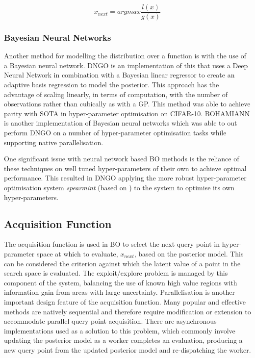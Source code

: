 			\begin{equation}\label{eq:TPE2} x_{next} = argmax \frac{l(x)}{g(x)}\end{equation}


		\subsubsection{Bayesian Neural Networks}

			Another method for modelling the distribution over a function is with the use of a Bayesian neural network. DNGO \cite{22} is an implementation of this that uses a Deep Neural Network in combination with a Bayesian linear regressor to create an adaptive basis regression to model the posterior. This approach has the advantage of scaling linearly, in terms of computation, with the number of observations rather than cubically as with a GP. This method was able to achieve parity with SOTA in hyper-parameter optimisation on CIFAR-10. BOHAMIANN \cite{40} is another implementation of Bayesian neural networks which was able to out perform DNGO on a number of hyper-parameter optimisation tasks while supporting native parallelisation. 
			\par
			One significant issue with neural network based BO methods is the reliance of these techniques on well tuned hyper-parameters of their own to achieve optimal performance. This resulted in DNGO applying the more robust hyper-parameter optimisation system \textit{spearmint} (based on \cite{20}) to the system to optimise its own hyper-parameters.




	\subsection {Acquisition Function} \label{AF}

		The acquisition function is used in BO to select the next query point in hyper-parameter space at which to evaluate, \(x_{next}\), based on the posterior model. This can be considered the criterion against which the latent value of a point in the search space is evaluated. The exploit/explore problem is managed by this component of the system, balancing the use of known high value regions with information gain from areas with large uncertainty. Parallelisation is another important design feature of the acquisition function. Many popular and effective methods are natively sequential and therefore require modification or extension to accommodate parallel query point acquisition. There are asynchronous implementations used as a solution to this problem, which commonly involve updating the posterior model as a worker completes an evaluation, producing a new query point from the updated posterior model and re-dispatching the worker. \cite{26}\cite{27}\cite{20}



